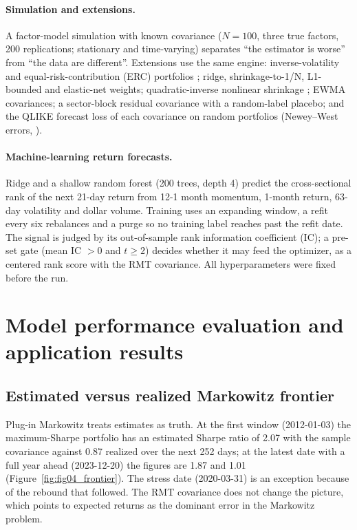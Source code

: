\documentclass[11pt,a4paper]{article}
\begin{document}
\paragraph{Simulation and extensions.} A factor-model simulation with known covariance ($N=100$, three true
factors, 200 replications; stationary and time-varying) separates ``the estimator is worse'' from ``the data
are different''. Extensions use the same engine: inverse-volatility and equal-risk-contribution (ERC)
portfolios \cite{maillard2010}; ridge, shrinkage-to-1/N, L1-bounded and elastic-net weights; quadratic-inverse
nonlinear shrinkage \cite{lw2022}; EWMA covariances; a sector-block residual covariance with a random-label
placebo; and the QLIKE forecast loss of each covariance on random portfolios (Newey--West errors,
\cite{neweywest1987}).

\paragraph{Machine-learning return forecasts.} Ridge and a shallow random forest (200 trees, depth 4) predict the
cross-sectional rank of the next 21-day return from 12-1 month momentum, 1-month return, 63-day volatility and
dollar volume. Training uses an expanding window, a refit every six rebalances and a purge so no training label
reaches past the refit date. The signal is judged by its out-of-sample rank information coefficient (IC); a
pre-set gate (mean IC $>0$ and $t\ge2$) decides whether it may feed the optimizer, as a centered rank score with
the RMT covariance. All hyperparameters were fixed before the run.

\section{Model performance evaluation and application results}

\subsection{Estimated versus realized Markowitz frontier}

Plug-in Markowitz treats estimates as truth. At the first window (2012-01-03) the maximum-Sharpe portfolio has an
estimated Sharpe ratio of 2.07 with the sample covariance against 0.87 realized over the next 252 days; at the
latest date with a full year ahead (2023-12-20) the figures are 1.87 and 1.01 (Figure~\ref{fig:fig04_frontier}).
The stress date (2020-03-31) is an exception because of the rebound that followed. The RMT covariance does not
change the picture, which points to expected returns as the dominant error in the Markowitz problem.
\end{document}
